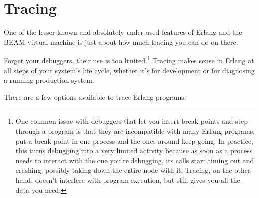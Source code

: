 \documentclass[11pt, oneside]{book}   	%
\begin{document}

\chapter{Tracing}
\label{chap:tracing}

One of the lesser known and absolutely under-used features of Erlang and the BEAM virtual machine is just about how much tracing you can do on there.

Forget your debuggers, their use is too limited.\footnote{One common issue with debuggers that let you insert break points and step through a program is that they are incompatible with many Erlang programs: put a break point in one process and the ones around keep going. In practice, this turns debugging into a very limited activity because as soon as a process needs to interact with the one you're debugging, its calls start timing out and crashing, possibly taking down the entire node with it. Tracing, on the other hand, doesn't interfere with program execution, but still gives you all the data you need.} Tracing makes sense in Erlang at all steps of your system's life cycle, whether it's for development or for diagnosing a running production system. 

There are a few options available to trace Erlang programs:
\end{document}
